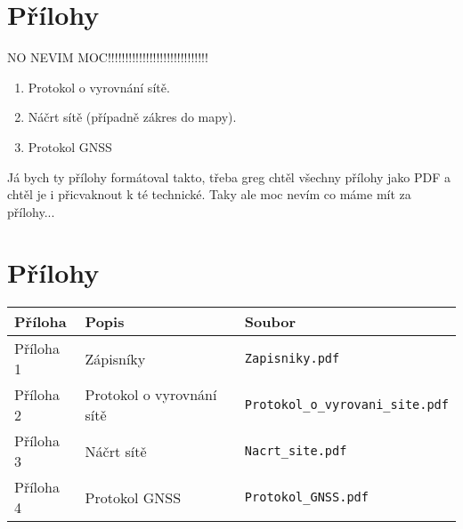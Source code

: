\section{Přílohy}
NO NEVIM MOC!!!!!!!!!!!!!!!!!!!!!!!!!!!!!

\begin{enumerate}
    \item Protokol o vyrovnání sítě.
    \item Náčrt sítě (případně zákres do mapy).
    \item Protokol GNSS
\end{enumerate}

Já bych ty přílohy formátoval takto, třeba greg chtěl všechny přílohy jako PDF a chtěl je i přicvaknout k té technické. Taky ale moc nevím co máme mít za přílohy...

\section{Přílohy}
\begin{tabular}{lll}
  \textbf{Příloha} & \textbf{Popis} & \textbf{Soubor} \\
  \hline
  Příloha 1 & Zápisníky & \texttt{Zapisniky.pdf} \\
  Příloha 2 & Protokol o vyrovnání sítě & \texttt{Protokol\_o\_vyrovani\_site.pdf} \\
  Příloha 3 & Náčrt sítě & \texttt{Nacrt\_site.pdf} \\
  Příloha 4 & Protokol GNSS & \texttt{Protokol\_GNSS.pdf} \\
\end{tabular}
